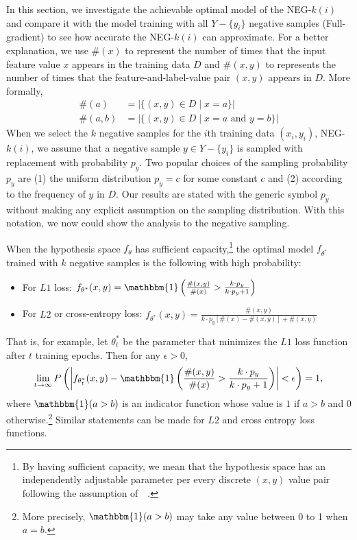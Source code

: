 In this section, we investigate the achievable optimal model of the NEG-$k(i)$ and compare it with the model training with all $Y - \{y_i\}$ negative samples (Full-gradient) to see how accurate the NEG-$k(i)$ can approximate. For a better explanation, we use $\#(x)$ to represent the number of times that the input feature value $x$ appears in the training data $D$ and $\#(x,y)$ to represents the number of times that the feature-and-label-value pair $(x,y)$ appears in $D$. More formally,
\small
\begin{align*}
\#(a)   &= \big\vert \{(x, y) \in D \mid x = a \}\big\vert \\
\#(a,b) &= \big\vert \{(x, y) \in D \mid x = a \text{ and } y = b\}\big\vert
\end{align*}
\normalsize
When we select the $k$ negative samples for the $i$th training data $(x_i, y_i)$, NEG-$k(i)$, we assume that a negative sample $y \in Y - \{y_i\}$ is sampled with replacement with probability $p_{y}$. Two popular choices of the sampling probability $p_{y}$ are (1) the uniform distribution $p_{y} = c$ for some constant $c$ and (2) according to the frequency of $y$ in $D$. Our results are stated with the generic symbol $p_y$ without making any explicit assumption on the sampling distribution. With this notation, we now could show the analysis to the negative sampling.
\begin{theorem}[Optimal Model of Negative Sampling]
	\label{th:neg-k}
	When the hypothesis space $f_{\theta}$ has sufficient capacity,\footnote{By having sufficient capacity,
		we mean that the hypothesis space has an independently adjustable parameter per every
		discrete $(x, y)$ value pair following the assumption of~~\citep{goldberg2014word2vec}.}
	the optimal model $f_{\theta^*}$ trained with $k$ negative samples is the following with high probability:
	\small
	\begin{itemize}
		\setlength\itemsep{-0.2em}
		\item For $L1$ loss: $f_{\theta^*}(x,y) = \mathbbm{1}\left(\frac{\#(x,y)}{\#(x)} > \frac{k \cdot p_y}{k \cdot p_y + 1}\right)$
		\item For $L2$ or cross-entropy loss:  $f_{\theta^*}(x,y) = \frac{\#(x,y)}{k \cdot p_y [\#(x)- \#(x,y)] + \#(x,y)}$
	\end{itemize}
	\normalsize
	That is, for example, let $\theta_t^*$ be the parameter that minimizes the $L1$ loss function after $t$ training epochs. Then for any $\epsilon > 0$, 
	\small
	\begin{equation*}
	\lim_{t\rightarrow \infty} P\left(\left\vert f_{\theta^*_t}(x, y) - \mathbbm{1}\left(\frac{\#(x,y)}{\#(x)} > \frac{k \cdot p_y}{k \cdot p_y + 1}\right) \right\vert < \epsilon\right) = 1,
	\end{equation*}
	\normalsize
	where $\mathbbm{1}(a > b)$ is an indicator function whose value is $1$ if $a > b$ and $0$ otherwise.\footnote{More precisely, $\mathbbm{1}(a > b)$ may take any value between 0 to 1 when $a = b$.} Similar statements can be made for $L2$ and cross entropy loss functions.
\end{theorem}
 

